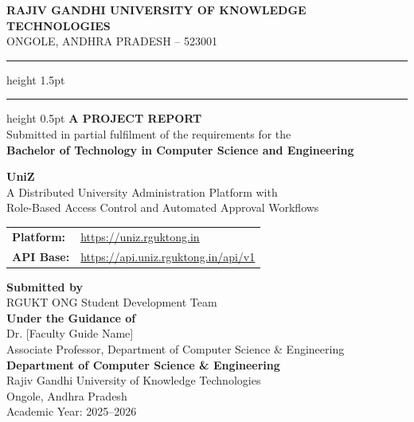 \documentclass[12pt,a4paper]{report}
\begin{document}
\begin{titlepage}
\centering
\vspace*{0.5cm}
{\Large \textbf{RAJIV GANDHI UNIVERSITY OF KNOWLEDGE TECHNOLOGIES}}\\[0.3cm]
{\large ONGOLE, ANDHRA PRADESH -- 523001}\\[0.5cm]
\hrule height 1.5pt\vspace{0.3cm}\hrule height 0.5pt\vspace{0.8cm}
{\LARGE \textbf{A PROJECT REPORT}}\\[0.3cm]
{\large Submitted in partial fulfilment of the requirements for the}\\[0.2cm]
{\large \textbf{Bachelor of Technology in Computer Science and Engineering}}\\[1.2cm]
\begin{mdframed}[linewidth=1.5pt,innertopmargin=10pt,innerbottommargin=10pt]
\centering
{\Huge \textbf{UniZ}}\\[0.4cm]
{\Large A Distributed University Administration Platform with}\\[0.2cm]
{\Large Role-Based Access Control and Automated Approval Workflows}
\end{mdframed}
\vspace{1.2cm}
\begin{tabular}{ll}
\textbf{Platform:} & \url{https://uniz.rguktong.in} \\[4pt]
\textbf{API Base:} & \url{https://api.uniz.rguktong.in/api/v1} \\
\end{tabular}
\vspace{1.5cm}
{\large \textbf{Submitted by}}\\[0.4cm]
{\large RGUKT ONG Student Development Team}\\[0.8cm]
{\large \textbf{Under the Guidance of}}\\[0.3cm]
{\large Dr. [Faculty Guide Name]}\\[0.2cm]
{\normalsize Associate Professor, Department of Computer Science \& Engineering}\\[1.5cm]
{\normalsize\textbf{Department of Computer Science \& Engineering}\\
Rajiv Gandhi University of Knowledge Technologies\\
Ongole, Andhra Pradesh\\
Academic Year: 2025--2026}
\end{titlepage}
\end{document}
